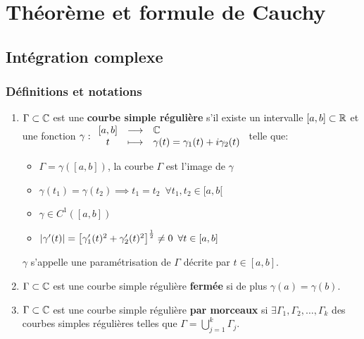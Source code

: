 \chapter{Théorème et formule de Cauchy}


\section{Intégration complexe}

\subsection{Définitions et notations}

\begin{definition}[10.1, p.73]\hfill
\begin{enumerate}[label=\arabic{enumi})]
    \item
    $\Gamma \subset \mathbb{C}$ est une \textbf{courbe simple régulière} s'il existe un intervalle $[a,b] \subset \mathbb{R}$ et une fonction $\gamma: \begin{array}{ccl} [a,b] & \longrightarrow & \mathbb{C}\\ t & \longmapsto & \gamma(t) = \gamma_1(t) + i\gamma_2(t)\end{array}$ telle que:
    
    \begin{itemize}
    \item $\Gamma = \gamma([a,b])$, la courbe $\Gamma$ est l'image de $\gamma$
    \item $\gamma(t_1) = \gamma(t_2) \implies t_1 = t_2 \enspace \forall t_1,t_2 \in [a,b[$
    \item $\gamma \in C^1\left([a,b]\right)$
    \item $\left|\gamma'(t)\right| = \left[\gamma_1'(t)^2 + \gamma_2'(t)^2\right]^\frac{1}{2} \neq 0 \enspace \forall t \in [a,b]$
    \end{itemize}

    $\gamma$ s'appelle une paramétrisation de $\Gamma$ décrite par $t \in [a,b]$.
    
    \item
    $\Gamma \subset \mathbb{C}$ est une courbe simple régulière \textbf{fermée} si de plus $\gamma(a) = \gamma(b)$.
    
    \item
    $\Gamma \subset \mathbb{C}$ est une courbe simple régulière \textbf{par morceaux} si $\exists \Gamma_1, \Gamma_2,\ldots,\Gamma_k$ des courbes simples régulières telles que $\Gamma = \bigcup\limits_{j = 1}^k \Gamma_j$.
    

\end{enumerate}
\end{definition}
